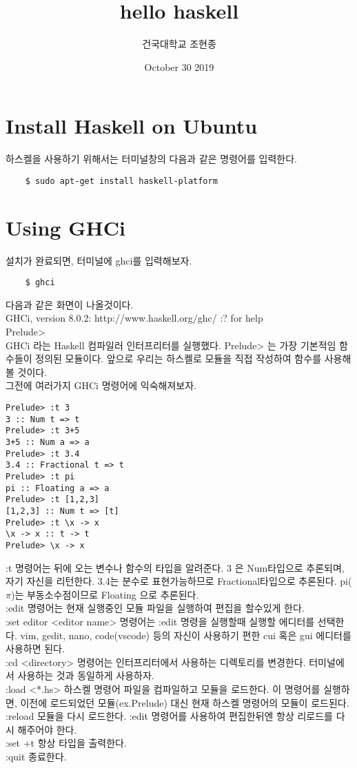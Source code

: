 \documentclass{article}
\begin{document}
\title{hello haskell}
\author{건국대학교 조현종}
\date{October 30 2019}

\maketitle

\section{Install Haskell on Ubuntu}
하스켈을 사용하기 위해서는 터미널창의 다음과 같은 명령어를 입력한다.
\begin{verbatim}
    $ sudo apt-get install haskell-platform
\end{verbatim}


\section{Using GHCi}
설치가 완료되면, 터미널에 ghci를 입력해보자. 

\begin{verbatim}
    $ ghci
\end{verbatim}
다음과 같은 화면이 나올것이다.\\
GHCi, version 8.0.2: http://www.haskell.org/ghc/  :? for help \\
Prelude> \\
GHCi 라는 Haskell 컴파일러 인터프리터를 실행했다. Prelude> 는 가장 기본적임 함수들이 정의된 모듈이다. 앞으로 우리는 하스켈로 모듈을 직접 작성하여 함수를 사용해 볼 것이다. \\
그전에 여러가지 GHCi 명령어에 익숙해져보자.

\begin{verbatim}
Prelude> :t 3
3 :: Num t => t
Prelude> :t 3+5
3+5 :: Num a => a
Prelude> :t 3.4
3.4 :: Fractional t => t
Prelude> :t pi
pi :: Floating a => a
Prelude> :t [1,2,3]
[1,2,3] :: Num t => [t]
Prelude> :t \x -> x
\x -> x :: t -> t
Prelude> \x -> x
\end{verbatim}
:t 명령어는 뒤에 오는 변수나 함수의 타입을 알려준다. 3 은 Num타입으로 추론되며, 자기 자신을 리턴한다. 3.4는 분수로 표현가능하므로 Fractional타입으로 추론된다. pi($\pi$)는 부동소수점이므로 Floating
으로 추론된다.\\
:edit 명령어는 현재 실행중인 모듈 파일을 실행하여 편집을 할수있게 한다. \\
:set editor <editor name> 명령어는 :edit 명령을 실행할때 실행할 에디터를 선택한다. vim, gedit, nano, code(vscode) 등의 자신이 사용하기 편한 cui 혹은 gui 에디터를 사용하면 된다. \\
:cd <directory> 명령어는 인터프리터에서 사용하는 디렉토리를 변경한다. 터미널에서 사용하는 것과 동일하게 사용하자. \\
:load <*.hs> 하스켈 명령어 파일을 컴파일하고 모듈을 로드한다. 이 명령어를 실행하면, 이전에 로드되었던 모듈(ex.Prelude) 대신 현재 하스켈 명령어의 모듈이 로드된다. \\
:reload 모듈을 다시 로드한다. :edit 명령어를 사용하여 편집한뒤엔 항상 리로드를 다시 해주어야 한다. \\
:set +t 항상 타입을 출력한다. \\
:quit 종료한다.
\end{document}
